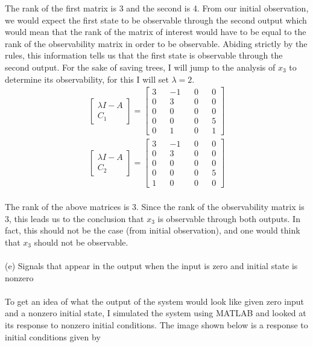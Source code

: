 \documentclass[paper=a4,margin, fontsize=11pt]{scrartcl} %
\numberwithin{equation}{section} %
\numberwithin{figure}{section} %
\numberwithin{table}{section} %
\begin{document}
The rank of the first matrix is 3 and the second is 4. From our initial observation, we would expect the first state to be observable through the second output which would mean that the rank of the matrix of interest would have to be equal to the rank of the observability matrix in order to be observable.  Abiding strictly by the rules, this information tells us that the first state is observable through the second output.  For the sake of saving trees, I will jump to the analysis of $x_3$ to determine its observability, for this I will set $\lambda=2$.\\

\begin{align*}
\begin{bmatrix} \lambda I-A \\ C_1 \end{bmatrix}=\begin{bmatrix} 3 && -1 && 0 && 0\\0 && 3 && 0 && 0\\0 && 0 && 0 && 0\\0 && 0 && 0 && 5\\ 0 && 1 && 0 && 1 \end{bmatrix}
\\
\begin{bmatrix}\lambda I-A \\ C_2 \end{bmatrix}=\begin{bmatrix} 3 && -1 && 0 && 0\\0 && 3 && 0 && 0\\0 && 0 && 0 && 0\\0 && 0 && 0 && 5\\ 1 && 0 && 0 && 0 \end{bmatrix}
\end{align*}  
\\
The rank of the above matrices is 3.  Since the rank of the observability matrix is 3, this leads us to the conclusion that $x_3$ is observable through both outputs.  In fact, this should not be the case (from initial observation), and one would think that $x_3$ should not be observable.\\
\\
(e) Signals that appear in the output when the input is zero and initial state is nonzero\\
\\
To get an idea of what the output of the system would look like given zero input and a nonzero initial state, I simulated the system using MATLAB and looked at its response to nonzero initial conditions.  The image shown below is a response to initial conditions given by
\end{document}
